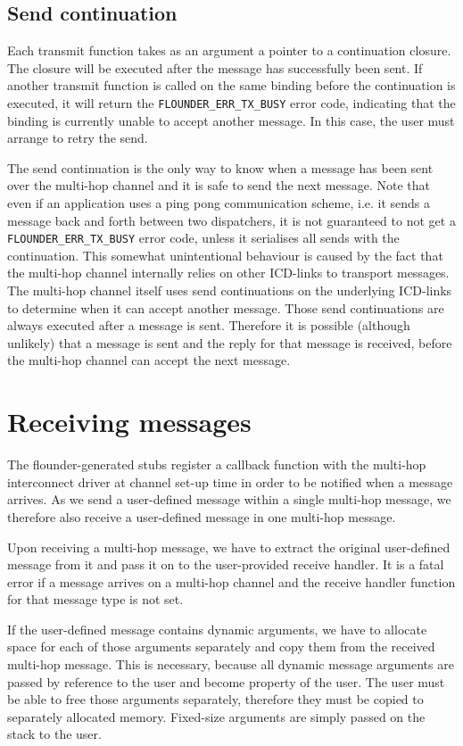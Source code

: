 \documentclass[a4paper,twoside]{report} %
\begin{document}
\subsection{Send continuation}
Each transmit function takes as an argument a pointer to a continuation closure. The closure will be executed after the message has successfully been sent. If another transmit function is called on the same binding before the continuation is executed, it will return the \texttt{FLOUNDER\_ERR\_TX\_BUSY} error code, indicating that the binding is currently unable to accept another message. In this case, the user must arrange to retry the send.

The send continuation is the only way to know when a message has been sent over the multi-hop channel and it is safe to send the next message. Note that even if an application uses a ping pong communication scheme, i.e. it sends a message back and forth between two dispatchers, it is not guaranteed to not get a \texttt{FLOUNDER\_ERR\_TX\_BUSY} error code, unless it serialises all sends with the continuation. This somewhat unintentional behaviour is caused by the fact that the multi-hop channel internally relies on other ICD-links to transport messages. The multi-hop channel itself uses send continuations on the underlying ICD-links to determine when it can accept another message. Those send continuations are always executed after a message is sent. Therefore it is possible (although unlikely) that a message is sent and the reply for that message is received, before the multi-hop channel can accept the next message.


\section{Receiving messages}
The flounder-generated stubs register a callback function with the multi-hop interconnect driver at channel set-up time in order to be notified when a message arrives. As we send a user-defined message within a single multi-hop message, we therefore also receive a user-defined message in one multi-hop message.

Upon receiving a multi-hop message, we have to extract the original user-defined message from it and pass it on to the user-provided receive handler. It is a fatal error if a message arrives on a multi-hop channel and the receive handler function for that message type is not set.

If the user-defined message contains dynamic arguments, we have to allocate space for each of those arguments separately and copy them from the received multi-hop message. This is necessary, because all dynamic message arguments are passed by reference to the user and become property of the user. The user must be able to free those arguments separately, therefore they must be copied to separately allocated memory. Fixed-size arguments are simply passed on the stack to the user.
\end{document}
